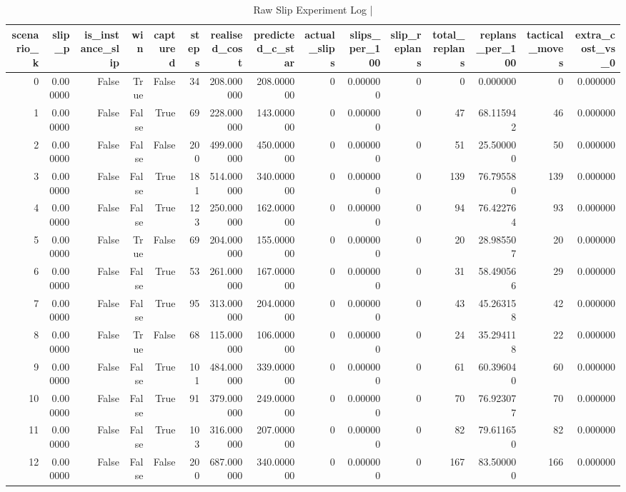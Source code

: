 \begin{table}[htbp]
\centering
\caption{Raw Slip Experiment Log | \stampline}
\label{tab:partC_slip_raw}
\begin{tabular}{rrrrrrrrrrrrrrr}
\toprule
scenario\_k & slip\_p & is\_instance\_slip & win & captured & steps & realised\_cost & predicted\_c\_star & actual\_slips & slips\_per\_100 & slip\_replans & total\_replans & replans\_per\_100 & tactical\_moves & extra\_cost\_vs\_0 \\
\midrule
0 & 0.000000 & False & True & False & 34 & 208.000000 & 208.000000 & 0 & 0.000000 & 0 & 0 & 0.000000 & 0 & 0.000000 \\
1 & 0.000000 & False & False & True & 69 & 228.000000 & 143.000000 & 0 & 0.000000 & 0 & 47 & 68.115942 & 46 & 0.000000 \\
2 & 0.000000 & False & False & False & 200 & 499.000000 & 450.000000 & 0 & 0.000000 & 0 & 51 & 25.500000 & 50 & 0.000000 \\
3 & 0.000000 & False & False & True & 181 & 514.000000 & 340.000000 & 0 & 0.000000 & 0 & 139 & 76.795580 & 139 & 0.000000 \\
4 & 0.000000 & False & False & True & 123 & 250.000000 & 162.000000 & 0 & 0.000000 & 0 & 94 & 76.422764 & 93 & 0.000000 \\
5 & 0.000000 & False & True & False & 69 & 204.000000 & 155.000000 & 0 & 0.000000 & 0 & 20 & 28.985507 & 20 & 0.000000 \\
6 & 0.000000 & False & False & True & 53 & 261.000000 & 167.000000 & 0 & 0.000000 & 0 & 31 & 58.490566 & 29 & 0.000000 \\
7 & 0.000000 & False & False & True & 95 & 313.000000 & 204.000000 & 0 & 0.000000 & 0 & 43 & 45.263158 & 42 & 0.000000 \\
8 & 0.000000 & False & True & False & 68 & 115.000000 & 106.000000 & 0 & 0.000000 & 0 & 24 & 35.294118 & 22 & 0.000000 \\
9 & 0.000000 & False & False & True & 101 & 484.000000 & 339.000000 & 0 & 0.000000 & 0 & 61 & 60.396040 & 60 & 0.000000 \\
10 & 0.000000 & False & False & True & 91 & 379.000000 & 249.000000 & 0 & 0.000000 & 0 & 70 & 76.923077 & 70 & 0.000000 \\
11 & 0.000000 & False & False & True & 103 & 316.000000 & 207.000000 & 0 & 0.000000 & 0 & 82 & 79.611650 & 82 & 0.000000 \\
12 & 0.000000 & False & False & False & 200 & 687.000000 & 340.000000 & 0 & 0.000000 & 0 & 167 & 83.500000 & 166 & 0.000000 \\

\end{tabular}
\end{table}
